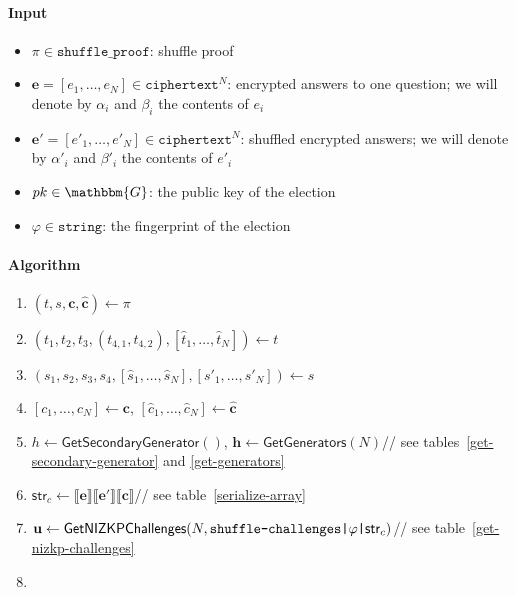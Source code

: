 \documentclass[a4paper]{article}
\newcommand{\G}{\mathbbm{G}}
\newcommand{\jstring}{\texttt{string}}
\begin{document}
\begin{table}
  \small
  \begin{framed}
    \noindent\paragraph{Input}
    \begin{itemize}
    \item $\pi\in\texttt{shuffle\_proof}$: shuffle proof
    \item $\textbf{e}=[e_1,\dots,e_N]\in\texttt{ciphertext}^N$:
      encrypted answers to one question; we will denote by
      $\alpha_i$ and $\beta_i$ the contents of $e_i$
    \item $\textbf{e}'=[e'_1,\dots,e'_N]\in\texttt{ciphertext}^N$:
      shuffled encrypted answers; we will denote by
      $\alpha'_i$ and $\beta'_i$ the contents of $e'_i$
    \item $pk\in\G$: the public key of the election
    \item $\varphi\in\jstring$: the fingerprint of the election
    \end{itemize}
    \noindent\paragraph{Algorithm}
    \begin{enumerate}
    \item $(t,s,\textbf{c},\hat{\textbf{c}})\leftarrow\pi$
    \item $(t_1,t_2,t_3,(t_{4,1},t_{4,2}),[\hat{t}_1,\dots,\hat{t}_N])\leftarrow t$
    \item $(s_1,s_2,s_3,s_4,[\hat{s}_1,\dots,\hat{s}_N],[s'_1,\dots,s'_N])\leftarrow s$
    \item $[c_1,\dots,c_N]\leftarrow\textbf{c}$,
      $[\hat{c}_1,\dots,\hat{c}_N]\leftarrow\hat{\textbf{c}}$
    \item $h\leftarrow\textsf{GetSecondaryGenerator}()$,
      $\textbf{h}\leftarrow\textsf{GetGenerators}(N)$\hfill// see
      tables~\ref{get-secondary-generator} and \ref{get-generators}
    \item
      $\textsf{str}_c\leftarrow\llbracket\textbf{e}\rrbracket\llbracket\textbf{e}'\rrbracket\llbracket\textbf{c}\rrbracket$\hfill//
      see table~\ref{serialize-array}
    \item
      $\textbf{u}\leftarrow\textsf{GetNIZKPChallenges}(N,\verb=shuffle-challenges|=\varphi\verb=|=\textsf{str}_c)$\hfill//
      see table~\ref{get-nizkp-challenges}
    \item

\end{enumerate}
\end{framed}
\end{table}
\end{document}
